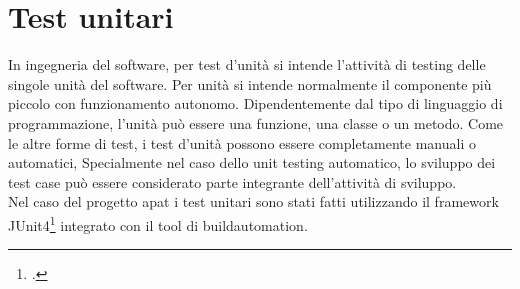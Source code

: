 \section{Test unitari}\label{sec:test-unitari}
In ingegneria del software, per test d’unità si intende l’attività di testing delle
singole unità del software.
Per unità si intende normalmente il componente più piccolo con funzionamento autonomo.
Dipendentemente dal tipo di linguaggio di programmazione, l’unità può essere una funzione, una classe o un metodo.
Come le altre forme di test, i test d’unità possono essere completamente
manuali o automatici, Specialmente nel caso dello unit testing automatico, lo sviluppo dei test case può essere considerato parte integrante dell’attività di sviluppo.\\
Nel caso del progetto \gls{apat} i test unitari sono stati fatti utilizzando il framework JUnit4\footcite{site:junit4} integrato con il tool di \gls{buildautomation}.

\setcounter{rowcount}{0}

\setcounter{testCounter}{0}

